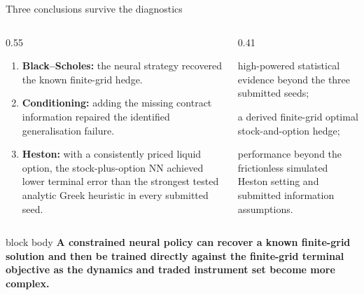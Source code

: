 \begin{frame}[t]{Three conclusions survive the diagnostics}
  \begin{columns}[T,onlytextwidth]
    \begin{column}{0.55\textwidth}
      \vspace{0.10cm}
      {\fontsize{8.2}{9.8}\selectfont
      \begin{enumerate}
        \setlength{\itemsep}{0.10cm}
        \item \textbf{Black--Scholes:} the neural strategy recovered the known finite-grid hedge.
        \item \textbf{Conditioning:} adding the missing contract information repaired the identified generalisation failure.
        \item \textbf{Heston:} with a consistently priced liquid option, the stock-plus-option NN achieved lower terminal error than the strongest tested analytic Greek heuristic in every submitted seed.
      \end{enumerate}}
    \end{column}
    \begin{column}{0.41\textwidth}
      \vspace{0.10cm}
      {\fontsize{8.2}{9.8}\selectfont
      \begin{tightitemize}
        \item high-powered statistical evidence beyond the three submitted seeds;
        \item a derived finite-grid optimal stock-and-option hedge;
        \item performance beyond the frictionless simulated Heston setting and submitted information assumptions.
      \end{tightitemize}}
    \end{column}
  \end{columns}
  \vspace{0.18cm}
  \begin{beamercolorbox}[rounded=true,sep=0.14cm]{block body}
    \centering\color{DeepNavy}\bfseries
    A constrained neural policy can recover a known finite-grid solution and then be trained directly against the finite-grid terminal objective as the dynamics and traded instrument set become more complex.
  \end{beamercolorbox}
\end{frame}
